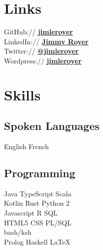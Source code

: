 \documentclass[letterpaper]{deedy-resume} %
\begin{document}
\begin{minipage}[t]{0.33\textwidth} %


\section{Links}

GitHub:// \href{https://github.com/jimleroyer/}{\bf jimleroyer} \\
LinkedIn:// \href{https://ca.linkedin.com/in/jimleroyer/}{\bf Jimmy Royer} \\
Twitter:// \href{https://twitter.com/jimleroyer}{\bf @jimleroyer} \\
Wordpress:// \href{http://jimleroyer.wordpress.com/}{\bf jimleroyer}

\sectionspace %


\section{Skills}

\subsection{Spoken Languages}

English \textbullet{} French

\sectionspace %

\subsection{Programming}

Java \textbullet{} TypeScript \textbullet{} Scala \\
Kotlin \textbullet{} Rust \textbullet{} Python 2 \\
Javascript \textbullet{} R \textbullet{} SQL \\ 
HTML5 \textbullet{} CSS \textbullet{} PL/SQL \\
bash/ksh \\ 
Prolog \textbullet{} Haskell \textbullet{} \LaTeX\


\end{minipage}
\end{document}
